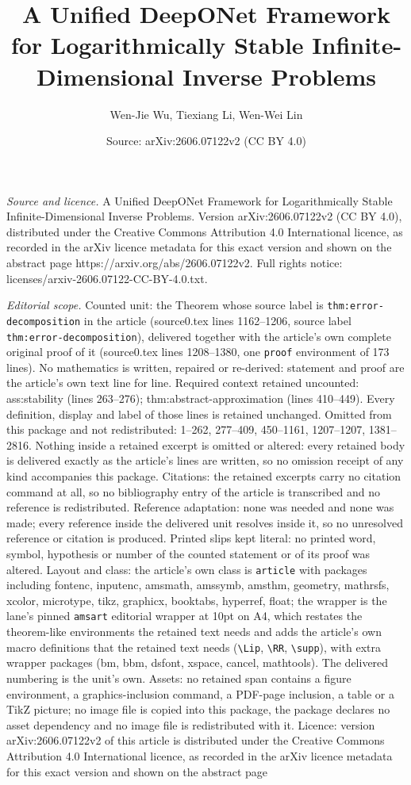 \documentclass[10pt,a4paper]{amsart}
\title[A Unified DeepONet Framework for Logarithmically Stable Infi]{A Unified DeepONet Framework for Logarithmically Stable Infinite-Dimensional Inverse Problems}
\author{Wen-Jie Wu, Tiexiang Li, Wen-Wei Lin}
\date{Source: arXiv:2606.07122v2 (CC BY 4.0)}
\begin{document}
\maketitle

\noindent\emph{Source and licence.} A Unified DeepONet Framework for Logarithmically Stable Infinite-Dimensional Inverse Problems. Version arXiv:2606.07122v2 (CC BY 4.0), distributed under the Creative Commons Attribution 4.0 International licence, as recorded in the arXiv licence metadata for this exact version and shown on the abstract page https://arxiv.org/abs/2606.07122v2. Full rights notice: licenses/arxiv-2606.07122-CC-BY-4.0.txt.\par\smallskip

\noindent\textit{Editorial scope.} Counted unit: the Theorem whose source label is \texttt{thm:error-decomposition} in the article (source0.tex lines 1162--1206, source label \texttt{thm:error-decomposition}), delivered together with the article's own complete original proof of it (source0.tex lines 1208--1380, one \texttt{proof} environment of 173 lines). No mathematics is written, repaired or re-derived: statement and proof are the article's own text line for line. Required context retained uncounted: ass:stability (lines 263--276); thm:abstract-approximation (lines 410--449). Every definition, display and label of those lines is retained unchanged. Omitted from this package and not redistributed: 1--262, 277--409, 450--1161, 1207--1207, 1381--2816. Nothing inside a retained excerpt is omitted or altered: every retained body is delivered exactly as the article's lines are written, so no omission receipt of any kind accompanies this package. Citations: the retained excerpts carry no citation command at all, so no bibliography entry of the article is transcribed and no reference is redistributed. Reference adaptation: none was needed and none was made; every reference inside the delivered unit resolves inside it, so no unresolved reference or citation is produced. Printed slips kept literal: no printed word, symbol, hypothesis or number of the counted statement or of its proof was altered. Layout and class: the article's own class is \texttt{article} with packages including fontenc, inputenc, amsmath, amssymb, amsthm, geometry, mathrsfs, xcolor, microtype, tikz, graphicx, booktabs, hyperref, float; the wrapper is the lane's pinned \texttt{amsart} editorial wrapper at 10pt on A4, which restates the theorem-like environments the retained text needs and adds the article's own macro definitions that the retained text needs (\texttt{\textbackslash Lip}, \texttt{\textbackslash RR}, \texttt{\textbackslash supp}), with extra wrapper packages (bm, bbm, dsfont, xspace, cancel, mathtools). The delivered numbering is the unit's own. Assets: no retained span contains a figure environment, a graphics-inclusion command, a PDF-page inclusion, a table or a TikZ picture; no image file is copied into this package, the package declares no asset dependency and no image file is redistributed with it. Licence: version arXiv:2606.07122v2 of this article is distributed under the Creative Commons Attribution 4.0 International licence, as recorded in the arXiv licence metadata for this exact version and shown on the abstract page 
\end{document}
